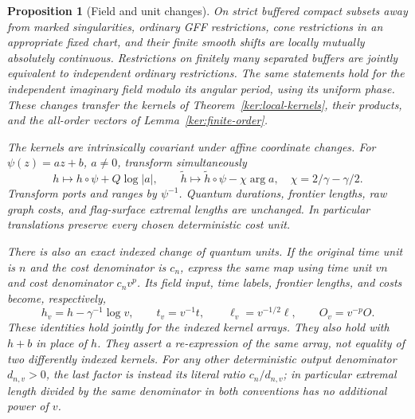 \documentclass[11pt]{article}
\numberwithin{equation}{section}
\newtheorem{proposition}[theorem]{Proposition}
\theoremstyle{definition}
\theoremstyle{remark}
\newcommand{\1}{\mathbf 1}
\begin{document}
\begin{proposition}[Field and unit changes]\label{ker:field-transfer}
On strict buffered compact subsets away from marked singularities,
ordinary GFF restrictions, cone restrictions in an appropriate fixed
chart, and their finite smooth shifts are locally mutually absolutely
continuous.  Restrictions on finitely many separated buffers are
jointly equivalent to independent ordinary restrictions.  The same
statements hold for the independent imaginary field modulo its
angular period, using its uniform phase.  These changes transfer the
kernels of Theorem~\ref{ker:local-kernels}, their products, and the
all-order vectors of Lemma~\ref{ker:finite-order}.

The kernels are intrinsically covariant under affine coordinate
changes.  For \(\psi(z)=az+b\), \(a\ne0\), transform simultaneously
\[
 h\longmapsto h\circ\psi+Q\log|a|,\qquad
 \widetilde h\longmapsto\widetilde h\circ\psi-\chi\arg a,
 \quad \chi=2/\gamma-\gamma/2.
\]
Transform ports and ranges by \(\psi^{-1}\).  Quantum durations,
frontier lengths, raw graph costs, and flag-surface extremal lengths
are unchanged.  In particular translations preserve every chosen
deterministic cost unit.

There is also an exact indexed change of quantum units.  If the
original time unit is \(n\) and the cost denominator is \(c_n\),
express the same map using time unit \(vn\) and cost denominator
\(c_nv^p\).  Its field input, time labels, frontier lengths, and costs
become, respectively,
\begin{equation}\label{ker:units}
 h_v=h-\gamma^{-1}\log v,\qquad
 t_v=v^{-1}t,\qquad \ell_v=v^{-1/2}\ell,
 \qquad O_v=v^{-p}O.
\end{equation}
These identities hold jointly for the indexed kernel arrays.  They
also hold with \(h+b\) in place of \(h\).  They assert a re-expression
of the same array, not equality of two differently indexed kernels.
For any other deterministic output denominator \(d_{n,v}>0\), the
last factor is instead its literal ratio \(c_n/d_{n,v}\); in
particular extremal length divided by the same denominator in both
conventions has no additional power of \(v\).
\end{proposition}
\end{document}
